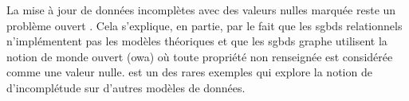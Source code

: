 La mise à jour de données incomplètes avec des valeurs nulles marquée reste un problème ouvert \cite{libkinIncompleteDataWhat2014,consoleCopingIncompleteData2020}.
Cela s'explique, en partie, par le fait que les \glspl{sgbd} relationnels n'implémentent pas les modèles théoriques \cite{zanioloDatabaseRelationsNull1982,faginSemanticsUpdatesDatabases1983,imielinskiIncompleteInformationRelational1984,abiteboulMiseajourBasesDonnees1985,reiterSoundSometimesComplete1986,faginUpdatingLogicalDatabases1986,winslettModelbasedApproachUpdating1988,grahneProblemIncompleteInformation1991,winslettUpdatingLogicalDatabases2004} et que les \glspl{sgbd} graphe utilisent la notion de monde ouvert (\acs{owa}) où toute propriété non renseignée est considérée comme une valeur nulle.
\cite{sirangeloRepresentingQueryingIncomplete2014} est un des rares exemples qui explore la notion de d'incomplétude sur d'autres modèles de données.
